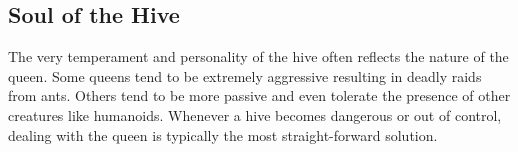 \documentclass[letterpaper,openany,twoside,twocolumn]{book}
\begin{document}
\vfill\eject\vspace*{5pt}

\subsection*{Soul of the Hive}
The very temperament and personality of the hive often reflects the nature of the queen. Some queens tend to be extremely aggressive resulting in deadly raids from ants. Others tend to be more passive and even tolerate the presence of other creatures like humanoids. Whenever a hive becomes dangerous or out of control, dealing with the queen is typically the most straight-forward solution.
\end{document}
